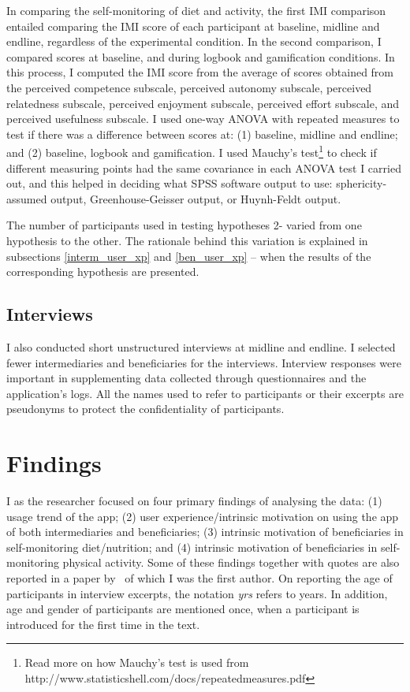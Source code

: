 In comparing the self-monitoring of diet and activity, the first IMI comparison  entailed comparing the IMI score of each participant at baseline, midline and endline, regardless of the experimental condition. In the second comparison, I compared scores at baseline, and during logbook and gamification conditions. In this process, I computed the IMI score from the average of scores obtained from the perceived competence subscale, perceived autonomy subscale, perceived relatedness subscale, perceived enjoyment subscale, perceived effort subscale, and perceived usefulness subscale. I used one-way ANOVA with repeated measures to test if there was a difference  between scores at: (1) baseline, midline and endline; and (2) baseline, logbook and gamification. I used Mauchy's test\footnote{Read more on how Mauchy's test is used from http://www.statisticshell.com/docs/repeatedmeasures.pdf} to check if different measuring points had the same covariance in each ANOVA test I carried out, and this helped in deciding what SPSS software output to use: sphericity-assumed output, Greenhouse-Geisser output, or Huynh-Feldt output.

The number of participants used in testing hypotheses 2\thinspace- varied from one hypothesis to the other. The rationale behind this variation is explained in subsections \ref{interm_user_xp} and \ref{ben_user_xp} -- when the results of the corresponding hypothesis are presented.
 
\subsection{Interviews}
I also conducted short unstructured interviews at midline and endline. I selected fewer intermediaries and beneficiaries for the interviews. Interview responses were important in supplementing data collected through questionnaires and the application's logs. All the names used to refer to participants or their excerpts are pseudonyms to protect the confidentiality of participants.
\section{Findings}
I as the researcher focused on four primary findings of analysing the data: (1) usage trend of the app; (2) user experience/intrinsic motivation on using the app of both intermediaries and beneficiaries; (3) intrinsic motivation of beneficiaries in self-monitoring diet/nutrition; and (4) intrinsic motivation of beneficiaries in self-monitoring physical activity. Some of these findings together with quotes are also reported in a paper by~\cite{katule2016family} of which I was the first author. On reporting the age of participants in interview excerpts, the notation \emph{yrs} refers to years. In addition, age and gender of participants are mentioned once, when a participant is introduced for the first time in the text. 
